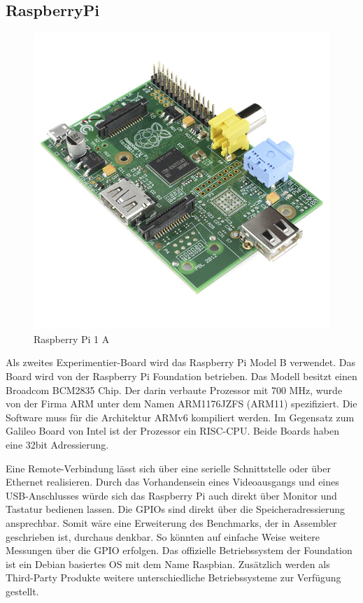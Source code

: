 \subsection{RaspberryPi}


\begin{figure}
\centering
\includegraphics[scale=0.4]{images/raspberry-pi-2.png}
\caption{Raspberry Pi 1 A\cite{raspberry_image}}
\label{fig:Raspberry Pi 1 A}
\end{figure}


Als zweites Experimentier-Board wird das Raspberry Pi Model B\cite{raspberry_foundation} verwendet. Das Board wird von der Raspberry Pi Foundation betrieben. Das Modell besitzt einen Broadcom BCM2835\cite{broadcom_datasheet} Chip. Der darin verbaute Prozessor mit 700 MHz, wurde von der Firma ARM unter dem Namen ARM1176JZFS\cite{arm_datasheet} (ARM11) spezifiziert. Die Software muss für die Architektur ARMv6 kompiliert werden. Im Gegensatz zum Galileo Board von Intel ist der Prozessor ein RISC-CPU. Beide Boards haben eine 32bit Adressierung.
\par
Eine Remote-Verbindung lässt sich über eine serielle Schnittstelle oder über Ethernet realisieren. Durch das Vorhandensein eines Videoausgangs und eines USB-Anschlusses würde sich das Raspberry Pi auch direkt über Monitor und Tastatur bedienen lassen. Die GPIOs sind direkt über die Speicheradressierung ansprechbar. Somit wäre eine Erweiterung des Benchmarks, der in Assembler geschrieben ist, durchaus denkbar. So könnten auf einfache Weise weitere Messungen über die GPIO erfolgen. Das offizielle Betriebssystem der Foundation ist ein Debian basiertes OS mit dem Name Raspbian. Zusätzlich werden als Third-Party Produkte weitere unterschiedliche Betriebssysteme zur Verfügung gestellt. 











